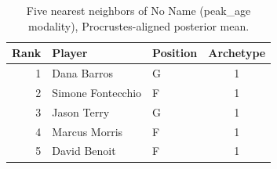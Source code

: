 \begin{table}[htbp]
  \centering\small
  \begin{tabular}{rllc}
    \toprule
    Rank & Player & Position & Archetype \\
    \midrule
    1 & Dana Barros & G & 1 \\
    2 & Simone Fontecchio & F & 1 \\
    3 & Jason Terry & G & 1 \\
    4 & Marcus Morris & F & 1 \\
    5 & David Benoit & F & 1 \\
    \bottomrule
  \end{tabular}
  \caption{Five nearest neighbors of No Name (peak_age modality), Procrustes-aligned posterior mean.}
  \label{tab:No_Name_neighbors_peak_age}
\end{table}

